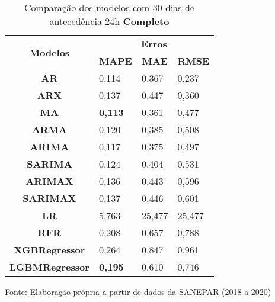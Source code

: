 \begin{table}[H]
	\centering
	\caption{Comparação dos modelos com 30 dias de antecedência 24h \textbf{Completo} }\label{tb:60-24cm}
	\begin{tabular}{@{}clll@{}}
		\toprule
		\multirow{2}{*}{\textbf{Modelos}} & \multicolumn{3}{c}{\textbf{Erros}}                                                                       \\ \cmidrule(l){2-4} 
		& \multicolumn{1}{c}{\textbf{MAPE}} & \multicolumn{1}{c}{\textbf{MAE}} & \multicolumn{1}{c}{\textbf{RMSE}} \\ \hline
\textbf{AR}                       & 0,114                             & 0,367                            & 0,237                             \\
\textbf{ARX}                      & 0,137                             & 0,447                            & 0,360                             \\
\textbf{MA}                       & \textbf{0,113}                             & 0,361                            & 0,477                             \\
\textbf{ARMA}                     & 0,120                             & 0,385                            & 0,508                             \\
\textbf{ARIMA}                    & 0,117                             & 0,375                            & 0,497                             \\
\textbf{SARIMA}                   & 0,124                             & 0,404                            & 0,531                             \\
\textbf{ARIMAX}                   & 0,136                             & 0,443                            & 0,596                             \\
\textbf{SARIMAX}                  & 0,137                             & 0,446                            & 0,601                             \\
\textbf{LR}                       & 5,763                             & 25,477                           & 25,477                            \\
\textbf{RFR}                      & 0,208                             & 0,657                            & 0,788                             \\
\textbf{XGBRegressor}             & 0,264                             & 0,847                            & 0,961                             \\
\textbf{LGBMRegressor}            & \textbf{0,195}                             & 0,610                            & 0,746                             \\ \bottomrule
	\end{tabular}

Fonte: Elaboração própria a partir de dados da SANEPAR (2018 a 2020)
\end{table}